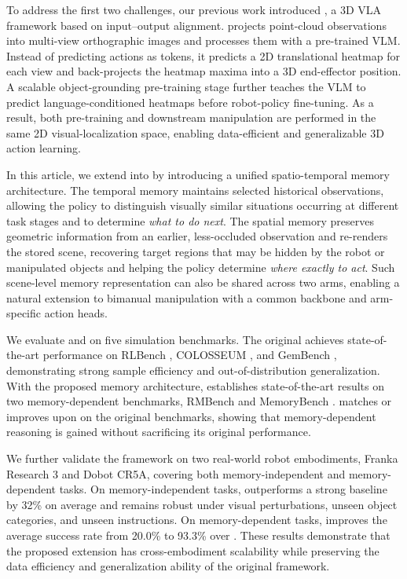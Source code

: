 To address the first two challenges, our previous work introduced
\method, a 3D VLA framework based on input--output alignment.
\method projects point-cloud observations into multi-view orthographic
images \cite{goyal2023rvt,goyal2024rvt} and processes them with a
pre-trained VLM.
Instead of predicting actions as tokens, it predicts a 2D translational
heatmap for each view and back-projects the heatmap maxima into a 3D
end-effector position.
A scalable object-grounding pre-training stage further teaches the VLM to
predict language-conditioned heatmaps before robot-policy fine-tuning.
As a result, both pre-training and downstream manipulation are performed in
the same 2D visual-localization space, enabling data-efficient and
generalizable 3D action learning.

In this article, we extend \method into \memmethod by introducing a unified
spatio-temporal memory architecture.
The temporal memory maintains selected historical observations, allowing the policy to distinguish visually similar
situations occurring at different task stages and to determine
\emph{what to do next}.
The spatial memory preserves geometric information from an earlier,
less-occluded observation and re-renders the stored scene, recovering target regions that may be hidden by the robot or manipulated objects and helping the policy
determine \emph{where exactly to act}.
Such scene-level memory representation can also be shared across two arms,
enabling a natural extension to bimanual manipulation with a common backbone
and arm-specific action heads.

We evaluate \method and \memmethod on five simulation benchmarks.
The original \method achieves state-of-the-art performance on
RLBench \cite{james2020rlbench},
COLOSSEUM \cite{pumacay2024colosseum}, and
GemBench \cite{garcia2024towards}, demonstrating strong sample efficiency
and out-of-distribution generalization.
With the proposed memory architecture, \memmethod establishes
state-of-the-art results on two memory-dependent benchmarks,
RMBench \cite{chen2026rmbench} and
MemoryBench \cite{fang2025sam2act}.
\memmethod matches or improves upon \method on the original
benchmarks, showing that memory-dependent reasoning is gained without
sacrificing its original performance.

We further validate the framework on two real-world robot embodiments,
Franka Research 3 and Dobot CR5A, covering both memory-independent and memory-dependent tasks.
On memory-independent tasks, \method outperforms a strong baseline by
32\% on average and remains robust under visual perturbations, unseen object
categories, and unseen instructions.
On memory-dependent tasks, \memmethod improves the average success rate from
20.0\% to 93.3\% over \method.
These results demonstrate that the proposed extension has cross-embodiment scalability while preserving the
data efficiency and generalization ability of the original framework.

